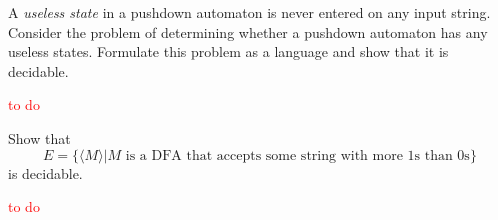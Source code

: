 \begin{exercise}
  A \textit{useless state} in a pushdown automaton is never entered on any input string. Consider the problem of determining whether a pushdown automaton has any useless states. Formulate this problem as a language and show that it is decidable.
\end{exercise}

\textcolor{red}{to do}

\setcounter{exercise}{26}

\begin{exercise}
  Show that
  \[
    E=\{\langle M\rangle|M\text{ is a DFA that accepts some string with more 1s than 0s}\}
  \] is decidable.
\end{exercise}

\textcolor{red}{to do}
